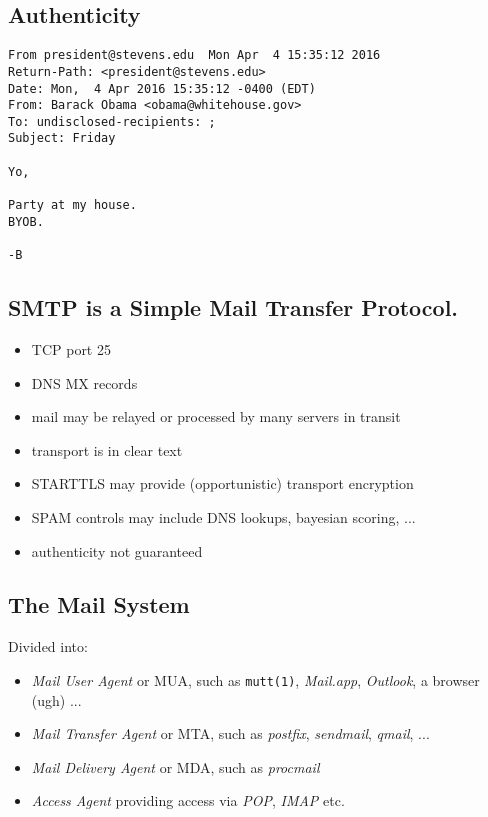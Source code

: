 \documentclass[xga]{xdvislides}
\begin{document}
\subsection{Authenticity}
\begin{verbatim}
From president@stevens.edu  Mon Apr  4 15:35:12 2016                                                
Return-Path: <president@stevens.edu>                                                                
Date: Mon,  4 Apr 2016 15:35:12 -0400 (EDT)
From: Barack Obama <obama@whitehouse.gov>
To: undisclosed-recipients: ;
Subject: Friday

Yo,

Party at my house.
BYOB.

-B
\end{verbatim}

\subsection{SMTP is a Simple Mail Transfer Protocol.}

\begin{itemize}
	\item TCP port 25
	\item DNS MX records
	\item mail may be relayed or processed by many servers in transit
	\item transport is in clear text
	\item STARTTLS may provide (opportunistic) transport encryption
	\item SPAM controls may include DNS lookups, bayesian scoring, ...
	\item authenticity not guaranteed
\end{itemize}

\subsection{The Mail System}
Divided into:
\begin{itemize}
	\item {\em Mail User Agent} or MUA, such as {\tt mutt(1)}, {\em Mail.app}, {\em Outlook}, a browser (ugh) ...
	\item {\em Mail Transfer Agent} or MTA, such as {\em postfix},
		{\em sendmail}, {\em qmail}, ...
	\item {\em Mail Delivery Agent} or MDA, such as {\em procmail}
	\item {\em Access Agent} providing access via {\em POP}, {\em IMAP} etc.
\end{itemize}
\end{document}
